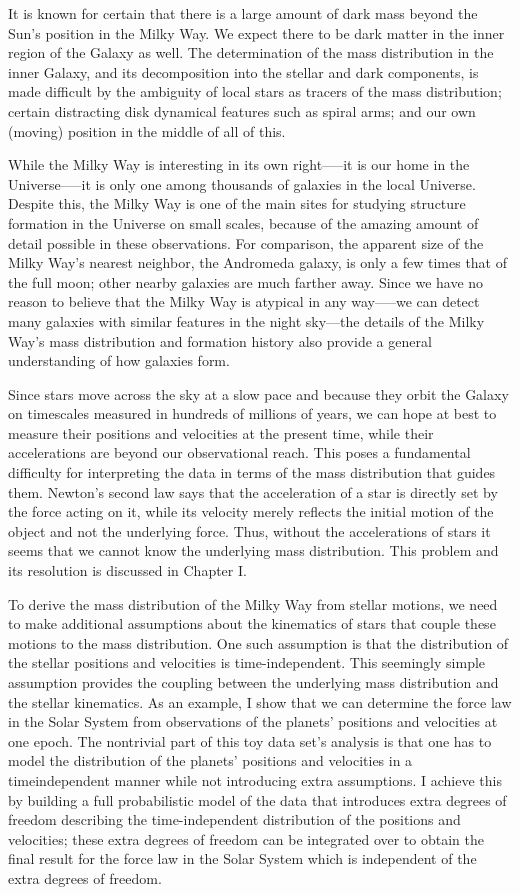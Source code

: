 It is known for certain that there is a large amount of dark mass
beyond the Sun’s position in the Milky Way. We expect there to be dark
matter in the inner region of the Galaxy as well. The determination of
the mass distribution in the inner Galaxy, and its decomposition into
the stellar and dark components, is made difficult by the ambiguity of
local stars as tracers of the mass distribution; certain distracting
disk dynamical features such as spiral arms; and our own (moving)
position in the middle of all of this. 

While the Milky Way is interesting in its own right—--it is our home
in the Universe--—it is only one among thousands of galaxies in the
local Universe. Despite this, the Milky Way is one of the main sites
for studying structure formation in the Universe on small scales,
because of the amazing amount of detail possible in these
observations. For comparison, the apparent size of the Milky Way’s
nearest neighbor, the Andromeda galaxy, is only a few times that of
the full moon; other nearby galaxies are much farther away. Since we
have no reason to believe that the Milky Way is atypical in any
way—--we can detect many galaxies with similar features in the night
sky—the details of the Milky Way’s mass distribution and formation
history also provide a general understanding of how galaxies form.


Since stars move across the sky at a slow pace and because they orbit
the Galaxy on timescales measured in hundreds of millions of years, we
can hope at best to measure their positions and velocities at the
present time, while their accelerations are beyond our observational
reach. This poses a fundamental difficulty for interpreting the data
in terms of the mass distribution that guides them.  Newton’s second
law says that the acceleration of a star is directly set by the force
acting on it, while its velocity merely reflects the initial motion of
the object and not the underlying force. Thus, without the
accelerations of stars it seems that we cannot know the underlying
mass distribution. This problem and its resolution is discussed in
Chapter I.

To derive the mass distribution of the Milky Way from stellar motions,
we need to make additional assumptions about the kinematics of stars
that couple these motions to the mass distribution. One such
assumption is that the distribution of the stellar positions and
velocities is time-independent.  This seemingly simple assumption
provides the coupling between the underlying mass distribution and the
stellar kinematics. As an example, I show that we can determine the
force law in the Solar System from observations of the planets’
positions and velocities at one epoch. The nontrivial part of this toy
data set’s analysis is that one has to model the distribution of the
planets’ positions and velocities in a timeindependent manner while
not introducing extra assumptions. I achieve this by building a full
probabilistic model of the data that introduces extra degrees of
freedom describing the time-independent distribution of the positions
and velocities; these extra degrees of freedom can be integrated over
to obtain the final result for the force law in the Solar System which
is independent of the extra degrees of freedom.

